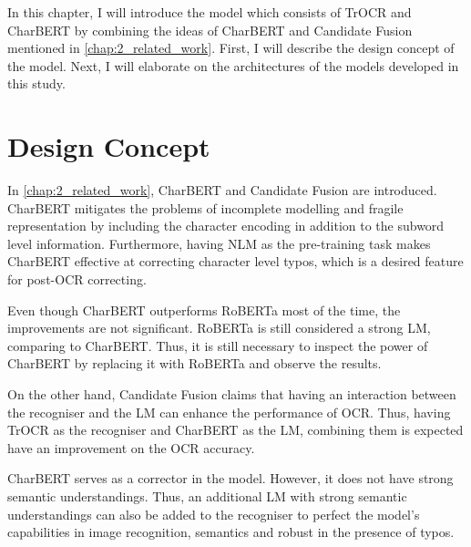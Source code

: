 \label{chap:3_method}
In this chapter, I will introduce the model which consists of TrOCR and CharBERT by combining the ideas of CharBERT and Candidate Fusion mentioned in \autoref{chap:2_related_work}. First, I will describe the design concept of the model. Next, I will elaborate on the architectures of the models developed in this study.

\section{Design Concept}
\label{sec:3_design_concept}
In \autoref{chap:2_related_work}, CharBERT and Candidate Fusion are introduced. CharBERT mitigates the problems of incomplete modelling and fragile representation by including the character encoding in addition to the subword level information. Furthermore, having NLM as the pre-training task makes CharBERT effective at correcting character level typos, which is a desired feature for post-OCR correcting. 

Even though CharBERT outperforms RoBERTa most of the time, the improvements are not significant. RoBERTa is still considered a strong LM, comparing to CharBERT. Thus, it is still necessary to inspect the power of CharBERT by replacing it with RoBERTa and observe the results.

On the other hand, Candidate Fusion claims that having an interaction between the recogniser and the LM can enhance the performance of OCR. Thus, having TrOCR as the recogniser and CharBERT as the LM, combining them is expected have an improvement on the OCR accuracy. 

CharBERT serves as a corrector in the model. However, it does not have strong semantic understandings. Thus, an additional LM with strong semantic understandings can also be added to the recogniser to perfect the model's capabilities in image recognition, semantics and robust in the presence of typos.

